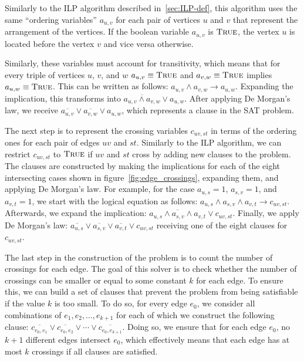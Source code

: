 Similarly to the ILP algorithm described in~\ref{sec:ILP-def}, this algorithm uses the same ``ordering variables'' $a_{u, v}$ for each pair of vertices $u$ and $v$ that represent the arrangement of the vertices.
If the boolean variable $a_{u, v}$ is $\textsc{True}$, the vertex $u$ is located before the vertex $v$ and vice versa otherwise.

Similarly, these variables must account for transitivity, which means that for every triple of vertices $u$, $v$, and $w$ $a_{u, v} \equiv \textsc{True}$ and $a_{v, w} \equiv \textsc{True}$ implies $a_{u, w} \equiv \textsc{True}$.
This can be written as follows: $a_{u, v} \land a_{v, w} \rightarrow a_{u, w}$.
Expanding the implication, this transforms into $\overline{a_{u, v} \land a_{v, w}} \lor a_{u, w}$.
After applying De Morgan's law, we receive $\overline{a_{u, v}} \lor \overline{a_{v, w}} \lor a_{u, w}$, which represents a clause in the SAT problem.

The next step is to represent the crossing variables $c_{uv, st}$ in terms of the ordering ones for each pair of edges $uv$ and $st$.
Similarly to the ILP algorithm, we can restrict $c_{uv, st}$ to $\textsc{True}$ if $uv$ and $st$ cross by adding new clauses to the problem.
The clauses are constructed by making the implications for each of the eight intersecting cases shown in figure~\ref{fig:edge_crossings}, expanding them, and applying De Morgan's law.
For example, for the case $a_{u,s} = 1$, $a_{s,v} = 1$, and $a_{v,t} = 1$, we start with the logical equation as follows: $a_{u,s} \land a_{s,v} \land a_{v,t} \rightarrow c_{uv, st}$.
Afterwards, we expand the implication: $\overline{a_{u,s} \land a_{s,v} \land a_{v,t}} \lor c_{uv, st}$.
Finally, we apply De Morgan's law: $\overline{a_{u,s}} \lor \overline{a_{s,v}} \lor \overline{a_{v,t}} \lor c_{uv, st}$ receiving one of the eight clauses for $c_{uv, st}$.

The last step in the construction of the problem is to count the number of crossings for each edge.
The goal of this solver is to check whether the number of crossings can be smaller or equal to some constant $k$ for each edge.
To ensure this, we can build a set of clauses that prevent the problem from being satisfiable if the value $k$ is too small.
To do so, for every edge $e_0$, we consider all combinations of $e_1, e_2, \dots, e_{k+1}$ for each of which we construct the following clause: $\overline{c_{e_0, e_1}} \lor \overline{c_{e_0, e_2}} \lor \cdots\lor \overline{c_{e_0, e_{k+1}}}$.
Doing so, we ensure that for each edge $e_0$, no $k + 1$ different edges intersect $e_0$, which effectively means that each edge has at most $k$ crossings if all clauses are satisfied.

